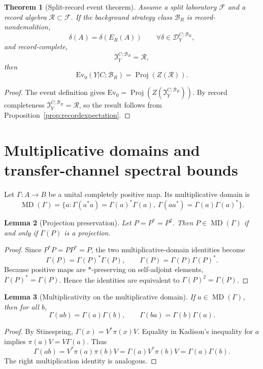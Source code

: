 \documentclass[11pt]{article}
\newtheorem{theorem}{Theorem}[section]
\newtheorem{lemma}[theorem]{Lemma}
\newcommand{\B}{\mathcal B}
\newcommand{\D}{\mathcal D}
\newcommand{\F}{\mathcal F}
\newcommand{\I}{\mathfrak I}
\newcommand{\R}{\mathcal R}
\DeclareMathOperator{\Proj}{Proj}
\newcommand{\MD}{\operatorname{MD}}
\newcommand{\Ev}{\mathrm{Ev}}
\begin{document}
\begin{theorem}[Split-record event theorem]
Assume a split laboratory $\F$ and a record algebra $\R\subset\F$.  If the background strategy class $\B_R$ is record-nondemolition,
\[
\delta(A)=\delta(E_R(A))\qquad\forall\delta\in\D_Y^{C;\B_R},
\]
and record-complete,
\[
\I_Y^{C;\B_R}=\R,
\]
then
\[
\Ev_0(Y|C;\B_R)=\Proj(Z(\R)).
\]
\end{theorem}

\begin{proof}
The event definition gives $\Ev_0=\Proj(Z(\I_Y^{C;\B_R}))$.  By record completeness $\I_Y^{C;\B_R}=\R$, so the result follows from Proposition~\ref{prop:recordexpectation}.
\end{proof}

\section{Multiplicative domains and transfer-channel spectral bounds}\label{app:md}

Let $\Gamma:A\to B$ be a unital completely positive map.  Its multiplicative domain is
\[
\MD(\Gamma)=\{a:\Gamma(a^*a)=\Gamma(a)^*\Gamma(a),\ \Gamma(aa^*)=\Gamma(a)\Gamma(a)^*\}.
\]

\begin{lemma}[Projection preservation]\label{lem:mdprojection}
Let $P=P^*=P^2$.  Then $P\in\MD(\Gamma)$ if and only if $\Gamma(P)$ is a projection.
\end{lemma}

\begin{proof}
Since $P^*P=PP^*=P$, the two multiplicative-domain identities become
\[
\Gamma(P)=\Gamma(P)^*\Gamma(P),\qquad
\Gamma(P)=\Gamma(P)\Gamma(P)^*.
\]
Because positive maps are $*$-preserving on self-adjoint elements, $\Gamma(P)^*=\Gamma(P)$.  Hence the identities are equivalent to $\Gamma(P)^2=\Gamma(P)$.
\end{proof}

\begin{lemma}[Multiplicativity on the multiplicative domain]
If $a\in\MD(\Gamma)$, then for all $b$,
\[
\Gamma(ab)=\Gamma(a)\Gamma(b),
\qquad
\Gamma(ba)=\Gamma(b)\Gamma(a).
\]
\end{lemma}

\begin{proof}
By Stinespring, $\Gamma(x)=V^*\pi(x)V$.  Equality in Kadison's inequality for $a$ implies $\pi(a)V=V\Gamma(a)$.  Thus
\[
\Gamma(ab)=V^*\pi(a)\pi(b)V=\Gamma(a)V^*\pi(b)V=\Gamma(a)\Gamma(b).
\]
The right multiplication identity is analogous.
\end{proof}
\end{document}
